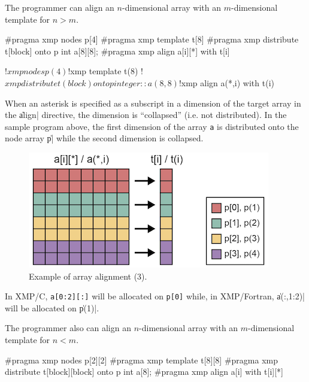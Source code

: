 
The programmer can align an $n$-dimensional array with an $m$-dimensional
template for $n > m$.

\begin{XCexample}
#pragma xmp nodes p[4]
#pragma xmp template t[8]
#pragma xmp distribute t[block] onto p
int a[8][8];
#pragma xmp align a[i][*] with t[i]
\end{XCexample}

\begin{XFexample}
!$xmp nodes p(4)
!$xmp template t(8)
!$xmp distribute t(block) onto p
integer :: a(8,8)
!$xmp align a(*,i) with t(i)
\end{XFexample}

When an asterisk is specified as a subscript in a dimension of the
target array in the \|align| directive, the dimension is ``collapsed''
(i.e. not distributed). In the sample program above, the first dimension of the
array {\tt a} is distributed onto the node array \|p| while the second
dimension is collapsed.

\begin{figure}
  \centering
  \includegraphics{figs/collapse.png}
  \caption{Example of array alignment (3).}
\end{figure}

In XMP/C, {\tt a[0:2][:]} will be allocated on {\tt p[0]} while, in
XMP/Fortran, \|a(:,1:2)| will be allocated on \|p(1)|.


The programmer also can align an $n$-dimensional array with an
$m$-dimensional template for $n < m$.

\begin{XCexample}
#pragma xmp nodes p[2][2]
#pragma xmp template t[8][8]
#pragma xmp distribute t[block][block] onto p
int a[8];
#pragma xmp align a[i] with t[i][*]
\end{XCexample}

